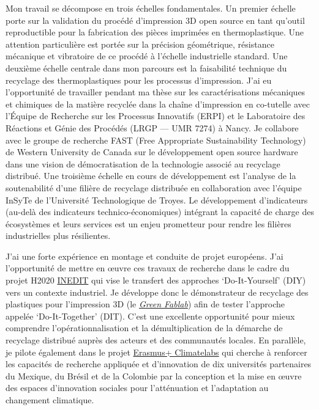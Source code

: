 \documentclass[
  11pt,
]{article}
\begin{document}
Mon travail se décompose en trois échelles fondamentales. Un premier
échelle porte sur la validation du procédé d'impression 3D open source
en tant qu'outil reproductible pour la fabrication des pièces imprimées
en thermoplastique. Une attention particulière est portée sur la
précision géométrique, résistance mécanique et vibratoire de ce procédé
à l'échelle industrielle standard. Une deuxième échelle centrale dans
mon parcours est la faisabilité technique du recyclage des
thermoplastiques pour les processus d'impression. J'ai eu l'opportunité
de travailler pendant ma thèse sur les caractérisations mécaniques et
chimiques de la matière recyclée dans la chaîne d'impression en
co-tutelle avec l'Équipe de Recherche sur les Processus Innovatifs
(ERPI) et le Laboratoire des Réactions et Génie des Procédés (LRGP ---
UMR 7274) à Nancy. Je collabore avec le groupe de recherche FAST (Free
Appropriate Sustainability Technology) de Western University de Canada
sur le développement open source hardware dans une vision de
démocratisation de la technologie associé au recyclage distribué. Une
troisième échelle en cours de développement est l'analyse de la
soutenabilité d'une filière de recyclage distribuée en collaboration
avec l'équipe InSyTe de l'Université Technologique de Troyes. Le
développement d'indicateurs (au-delà des indicateurs
technico-économiques) intégrant la capacité de charge des écosystèmes et
leurs services est un enjeu prometteur pour rendre les filières
industrielles plus résilientes.

J'ai une forte expérience en montage et conduite de projet européens.
J'ai l'opportunité de mettre en œuvre ces travaux de recherche dans le
cadre du projet H2020
\href{http://erpi.univ-lorraine.fr/projects/INEDIT/}{INEDIT} qui vise le
transfert des approches `Do-It-Yourself' (DIY) vers un contexte
industriel. Je développe donc le démonstrateur de recyclage des
plastiques pour l'impression 3D (le
\href{https://lf2l.fr/projects/green-fablab/\%5E\%5Bhttps://lf2l.fr/projects/green-fablab/\%5D}{\emph{Green
Fablab}}) afin de tester l'approche appelée `Do-It-Together' (DIT).
C'est une excellente opportunité pour mieux comprendre
l'opérationnalisation et la démultiplication de la démarche de recyclage
distribué auprès des acteurs et des communautés locales. En parallèle,
je pilote également dans le projet
\href{https://erpi.univ-lorraine.fr/fr/projects/Climatelabs/}{Erasmus+
Climatelabs} qui cherche à renforcer les capacités de recherche
appliquée et d'innovation de dix universités partenaires du Mexique, du
Brésil et de la Colombie par la conception et la mise en œuvre des
espaces d'innovation sociales pour l'atténuation et l'adaptation au
changement climatique.
\end{document}
